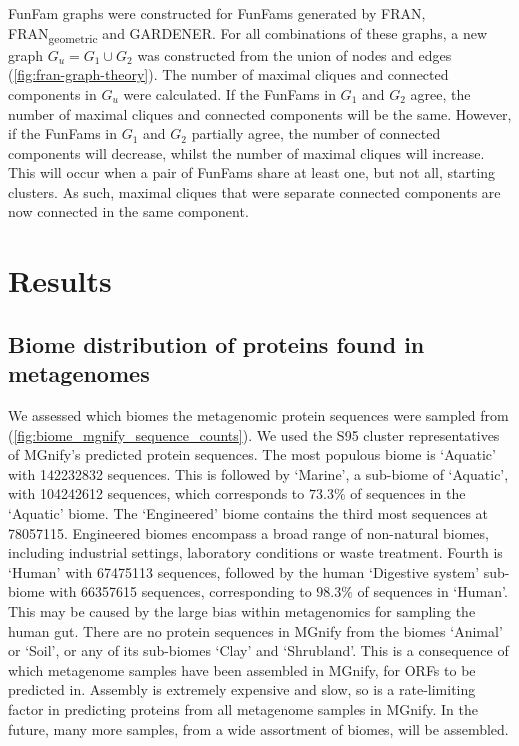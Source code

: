 FunFam graphs were constructed for FunFams generated by FRAN, FRAN\textsubscript{geometric} and GARDENER.
For all combinations of these graphs, a new graph $G_u = G_1 \cup G_2$ was constructed from the union of nodes and edges (\ref{fig:fran-graph-theory}).
The number of maximal cliques and connected components in $G_u$ were calculated.
If the FunFams in $G_1$ and $G_2$ agree, the number of maximal cliques and connected components will be the same.
However, if the FunFams in $G_1$ and $G_2$ partially agree, the number of connected components will decrease, whilst the number of maximal cliques will increase.
This will occur when a pair of FunFams share at least one, but not all, starting clusters.
As such, maximal cliques that were separate connected components are now connected in the same component.

\section{Results}

\subsection{Biome distribution of proteins found in metagenomes}

We assessed which biomes the metagenomic protein sequences were sampled from (\ref{fig:biome_mgnify_sequence_counts}). We used the S95 cluster representatives of MGnify's predicted protein sequences. The most populous biome is `Aquatic' with \num{142232832} sequences. This is followed by `Marine', a sub-biome of `Aquatic', with \num{104242612} sequences, which corresponds to $73.3\%$ of sequences in the `Aquatic' biome. The `Engineered' biome contains the third most sequences at \num{78057115}. Engineered biomes encompass a broad range of non-natural biomes, including industrial settings, laboratory conditions or waste treatment. Fourth is `Human' with \num{67475113} sequences, followed by the human `Digestive system' sub-biome with \num{66357615} sequences, corresponding to $98.3\%$ of sequences in `Human'. This may be caused by the large bias within metagenomics for sampling the human gut. There are no protein sequences in MGnify from the biomes `Animal' or `Soil', or any of its sub-biomes `Clay' and `Shrubland'. This is a consequence of which metagenome samples have been assembled in MGnify, for ORFs to be predicted in. Assembly is extremely expensive and slow, so is a rate-limiting factor in predicting proteins from all metagenome samples in MGnify. In the future, many more samples, from a wide assortment of biomes, will be assembled.

